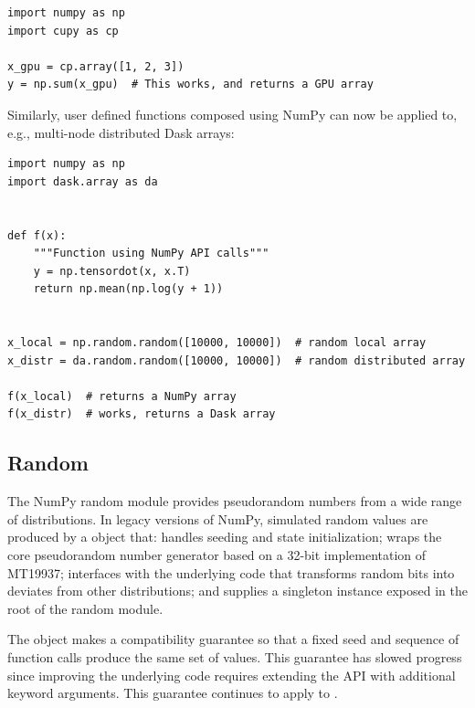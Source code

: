 \begin{lstlisting}
import numpy as np
import cupy as cp

x_gpu = cp.array([1, 2, 3])
y = np.sum(x_gpu)  # This works, and returns a GPU array
\end{lstlisting}


Similarly, user defined functions composed using NumPy can now be
applied to, e.g., multi-node distributed Dask arrays:

\begin{lstlisting}
import numpy as np
import dask.array as da


def f(x):
    """Function using NumPy API calls"""
    y = np.tensordot(x, x.T)
    return np.mean(np.log(y + 1))


x_local = np.random.random([10000, 10000])  # random local array
x_distr = da.random.random([10000, 10000])  # random distributed array

f(x_local)  # returns a NumPy array
f(x_distr)  # works, returns a Dask array
\end{lstlisting}

\subsection*{Random}


The NumPy random module provides pseudorandom numbers from a wide range of
distributions. In legacy versions of NumPy, simulated random values are produced
by a  object that: handles seeding and state initialization;
wraps the core pseudorandom number generator based on a 32-bit implementation of
MT19937; interfaces with the underlying code that transforms random bits into
deviates from other distributions; and supplies a singleton instance exposed in
the root of the random module.

The  object makes a compatibility guarantee so that a fixed
seed and sequence of function calls produce the same set of values. This
guarantee has slowed progress since improving the underlying code requires
extending the API with additional keyword arguments. This guarantee continues to
apply to . 

